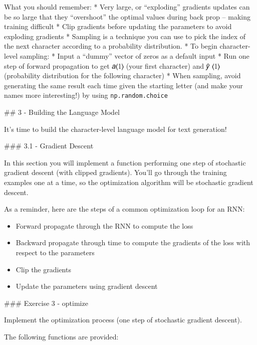 \documentclass[11pt]{article}
\providecommand{\tightlist}{%
      \setlength{\itemsep}{0pt}\setlength{\parskip}{0pt}}
\begin{document}
    What you should remember: * Very large, or ``exploding'' gradients
updates can be so large that they ``overshoot'' the optimal values
during back prop -- making training difficult * Clip gradients before
updating the parameters to avoid exploding gradients * Sampling is a
technique you can use to pick the index of the next character according
to a probability distribution. * To begin character-level sampling: *
Input a ``dummy'' vector of zeros as a default input * Run one step of
forward propagation to get 𝑎⟨1⟩ (your first character) and 𝑦̂ ⟨1⟩
(probability distribution for the following character) * When sampling,
avoid generating the same result each time given the starting letter
(and make your names more interesting!) by using
\texttt{np.random.choice}

    \#\# 3 - Building the Language Model

It's time to build the character-level language model for text
generation!

\#\#\# 3.1 - Gradient Descent

In this section you will implement a function performing one step of
stochastic gradient descent (with clipped gradients). You'll go through
the training examples one at a time, so the optimization algorithm will
be stochastic gradient descent.

As a reminder, here are the steps of a common optimization loop for an
RNN:

\begin{itemize}
\tightlist
\item
  Forward propagate through the RNN to compute the loss
\item
  Backward propagate through time to compute the gradients of the loss
  with respect to the parameters
\item
  Clip the gradients
\item
  Update the parameters using gradient descent
\end{itemize}

\#\#\# Exercise 3 - optimize

Implement the optimization process (one step of stochastic gradient
descent).

The following functions are provided:
\end{document}
